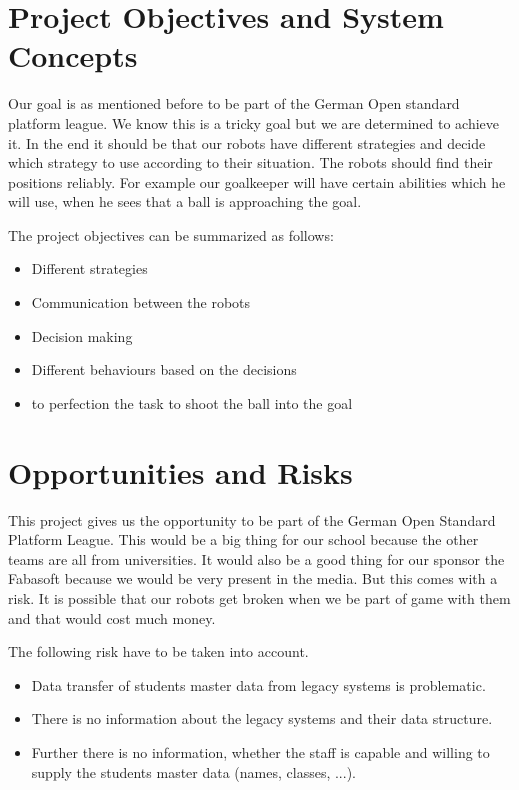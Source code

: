 \documentclass[12pt]{article}
\theoremstyle{definition}
\begin{document}
\pagebreak

\section{Project Objectives and System Concepts}

Our goal is as mentioned before to be part of the German Open standard platform league. We know this is a tricky goal but we are determined to achieve it. In the end it should be that our robots have different strategies and decide which strategy to use according to their situation. The robots should find their positions reliably. For example our goalkeeper will have certain abilities which he will use, when he sees that a ball is approaching the goal. \newline


The project objectives can be summarized as follows: \newline
\begin{itemize}
\item Different strategies 
\item Communication between the robots
\item Decision making
\item Different behaviours based on the decisions
\item to perfection the task to shoot the ball into the goal
\end{itemize}


\pagebreak
\section{Opportunities and Risks}

This project gives us the opportunity to be part of the German Open Standard Platform League. This would be a big thing for our school because the other teams are all from universities. It would also be a good thing for our sponsor the Fabasoft because we would be very present in the media. But this comes with a risk. It is possible that our robots get broken when we be part of game with them and that would cost much money.\newline



The following risk have to be taken into account.
\begin{itemize}
\item Data transfer of students master data from legacy systems is problematic.
\item There is no information about the legacy systems and their data structure.
\item Further there is no information, whether the staff is capable and willing to supply the students master data (names, classes, ...).
\end{itemize}
\end{document}
